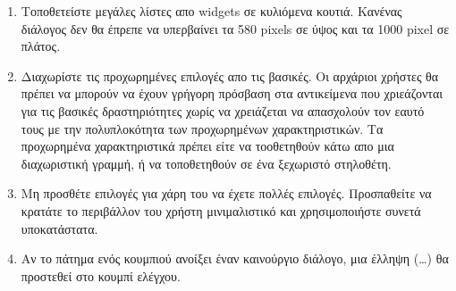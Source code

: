 \begin{enumerate}
 \item Τοποθετείστε μεγάλες λίστες απο widgets σε κυλιόμενα κουτιά. Κανένας διάλογος δεν θα έπρεπε να υπερβαίνει τα 580 pixels σε ύψος και τα 1000 pixel σε πλάτος.
 \item Διαχωρίστε τις προχωρημένες επιλογές απο τις βασικές. Οι αρχάριοι χρήστες θα πρέπει να μπορούν να έχουν γρήγορη πρόσβαση στα αντικείμενα που χριεάζονται για τις βασικές δραστηριότητες χωρίς να χρειάζεται να απασχολούν τον εαυτό τους με την πολυπλοκότητα των προχωρημένων χαρακτηριστικών. Τα προχωρημένα χαρακτηριστικά πρέπει είτε να τοοθετηθούν κάτω απο μια διαχωριστική γραμμή, ή να τοποθετηθούν σε ένα ξεχωριστό στηλοθέτη.
 \item Μη προσθέτε επιλογές για χάρη του να έχετε πολλές επιλογές. Προσπαθείτε να κρατάτε το περιβάλλον του χρήστη μινιμαλιστικό και χρησιμοποιήστε συνετά υποκατάστατα.
 \item Αν το πάτημα ενός κουμπιού ανοίξει έναν καινούργιο διάλογο, μια έλληψη (…) θα προστεθεί στο κουμπί ελέγχου.
 \end{enumerate}


